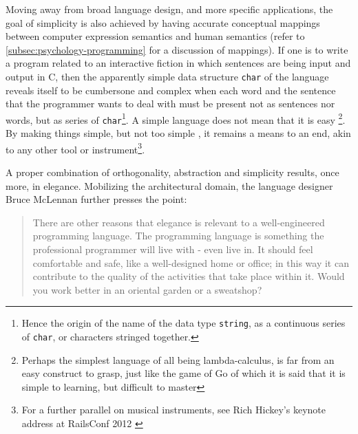 Moving away from broad language design, and more specific applications, the goal of simplicity is also achieved by having accurate conceptual mappings between computer expression semantics and human semantics (refer to \ref{subsec:psychology-programming} for a discussion of mappings). If one is to write a program related to an interactive fiction in which sentences are being input and output in C, then the apparently simple data structure \lstinline{char} of the language reveals itself to be cumbersone and complex when each word and the sentence that the programmer wants to deal with must be present not as sentences nor words, but as series of \lstinline{char}\footnote{Hence the origin of the name of the data type \lstinline{string}, as a continuous series of \lstinline{char}, or characters stringed together.}. A simple language does not mean that it is easy \footnote{Perhaps the simplest language of all being lambda-calculus, is far from an easy construct to grasp, just like the game of Go of which it is said that it is simple to learning, but difficult to master}. By making things simple, but not too simple \citep{biancuzzi_masterminds_2009}, it remains a means to an end, akin to any other tool or instrument\footnote{For a further parallel on musical instruments, see Rich Hickey's keynote address at RailsConf 2012 \citep{confreaks_rails_2012}}.

A proper combination of orthogonality, abstraction and simplicity results, once more, in elegance. Mobilizing the architectural domain, the language designer Bruce McLennan further presses the point:

\begin{quote}
  There are other reasons that elegance is relevant to a well-engineered programming language. The programming language is something the professional programmer will live with - even live in. It should feel comfortable and safe, like a well-designed home or office; in this way it can contribute to the quality of the activities that take place within it. Would you work better in an oriental garden or a sweatshop? \citep{mclennan_who_1997}
\end{quote}

